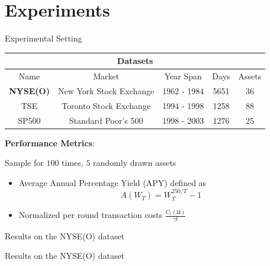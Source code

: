 \documentclass[10pt]{beamer}
\begin{document}
\section{Experiments}

\begin{frame}{Experimental Setting}

\begin{table}[ht!]\centering\small
\begin{tabular}{ |c||c|c|c|c| }
 \hline
 \multicolumn{5}{|c|}{Datasets} \\
 \hline
 Name & Market &Year Span & Days & Assets\\
 \hline
 \textbf{NYSE(O)} & New York Stock Exchange  & 1962 - 1984  &5651&   36\\
 TSE & Toronto Stock Exchange & 1994 - 1998  & 1258   &88\\
 SP500 & Standard Poor's 500 & 1998 - 2003 & 1276&  25\\
 \hline
\end{tabular}
\end{table}

\textbf{Performance Metrics}:

Sample for $100$ times, $5$ randomly drawn assets

\begin{itemize}
  \item Average Annual Percentage Yield (APY) defined as 
$$A(W_T)=W_T^{250/T} - 1$$
\item Normalized per round transaction costs $\frac{C_t(\mathfrak U)}{\gamma t}$
\end{itemize}
\end{frame}

\begin{frame}{Results on the NYSE(O) dataset}

\begin{figure}[t!]
    
\end{figure}

\end{frame}

\begin{frame}{Results on the NYSE(O) dataset}

\begin{figure}[t!]
    
\end{figure}

\end{frame}
\end{document}
